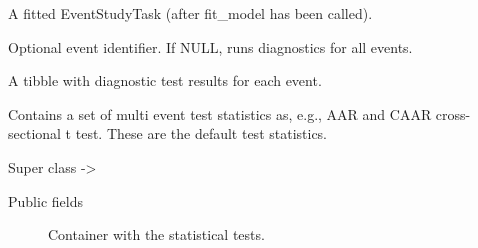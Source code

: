 \documentclass[a4paper]{book}
\begin{document}
%
\begin{Arguments}
\begin{ldescription}
\item[\code{task}] A fitted EventStudyTask (after fit\_model has been called).

\item[\code{event\_id}] Optional event identifier. If NULL, runs diagnostics
for all events.
\end{ldescription}
\end{Arguments}
%
\begin{Value}
A tibble with diagnostic test results for each event.
\end{Value}
%
\begin{Description}
Contains a set of multi event test statistics as, e.g., AAR and CAAR
cross-sectional t test. These are the default test statistics.
\end{Description}
%
\begin{Section}{Super class}
 -> 
\end{Section}
%
\begin{Section}{Public fields}

\begin{description}

\item[] Container with the statistical tests.

\end{description}


\end{Section}
%
\end{document}
